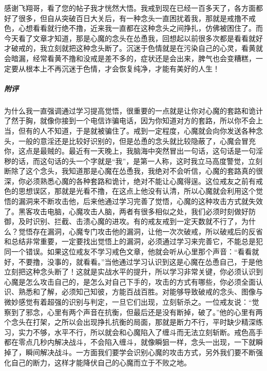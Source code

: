 \begin{case}
    感谢飞翔哥，看了您的帖子我才恍然大悟。我戒到现在已经一百多天了，各方面都好了很多，但自从突破百日大关后，有一种念头一直困扰着我，那就是戒撸不戒色，心想看看就行绝不撸，近来我一直都在这种念头之间挣扎，仿佛被困住了。而今天看了文章才知道，那是心魔的念头在怂恿我，回想起以前很多次都是看看就好才破戒的，我立刻就把这种念头断了。沉迷于色情就是在污染自己的心灵，看黄就会暗漏，经常看黄不撸和没戒是差不多的，症状还是会出来，脾气也会变糟糕，一定要从根本上不再沉迷于色情，才会恢复纯净，才能有美好的人生！
    \subparagraph{附评} 为什么我一直强调通过学习提高觉悟，很重要的一点就是让你对心魔的套路和诡计了然于胸，就像你接到一个电信诈骗电话，因为你知道对方的套路，所以你不会上当，但有的人不知道，于是就被骗住了。戒到一定程度，心魔就会向你发送各种念头，一般的意淫还是比较好识别的，但是怂恿的念头就比较隐蔽了，心魔会冒充你，这点是最贼的。最近有一天晚上，我脑海中突然冒出一句话，这句话是一句淫秽的话，而这句话的头一个字就是“我”，是第一人称，这时我立马高度警觉，立刻断除了这个念头，我知道那是心魔在怂恿我，我绝对不会听信，心魔的套路真的很深，你必须熟悉心魔的各种套路和诡计，绝对不能让心魔得逞。这位戒友之前有戒色的思想误区，那就是光看不撸，在这点上他没有认清，所以心魔就会利用这个觉悟的漏洞来不断攻击他，后来他通过学习完善了觉悟，心魔的这种攻击方式就失效了。黑客攻击电脑，心魔攻击人脑，两者有很多相似之处，我们必须时刻做好防御，及时识别、拦截、击溃心魔的进攻。有的戒友戒到一定天数就不行了，为什么？觉悟存在漏洞，心魔专门攻击他的漏洞，让他一次次破戒，所以破戒后的反省和总结非常重要，一定要找出觉悟上的漏洞，必须通过学习来完善它，不能总是犯同一个错误。如果这位戒友不学习戒色文章，他就会听从心里那个声音：“看看就好，不要撸，没事的，就看看。”当他通过学习认识到这是心魔在怂恿自己，于是他立刻把这种念头断了！这就是实战水平的提升，所以学习非常关键，你必须认识到心魔是怎么攻击自己的，是怎么对自己下手的，攻击的方式有哪些，你必须全面认识、熟悉和了解，必须知己知彼，方能百战百胜。对能够导致破戒的念头、图像与微妙感觉有着超强的识别与判定，一旦它们出现，立刻斩杀之。一位戒友说：“觉察到了邪念，心里有两个声音在抗衡，但最后还是没有断掉，破了。”他的心里有两个念头在打架，之所以会出现挣扎抗衡的局面，那就是断力不行，平时缺少精深练习，实力不够，水平不行，所以就会和心魔陷入了缠斗而无法立刻斩断。戒色高手都在零点几秒内解决战斗，不会陷入缠斗，就像瞬狙一样，念头一出现，一下就瞬掉了，瞬间解决战斗。一方面我们要学会识别心魔的攻击方式，另外我们要不断强化自己的断力，这样才能降伏自己的心魔而立于不败之地。
\end{case}

